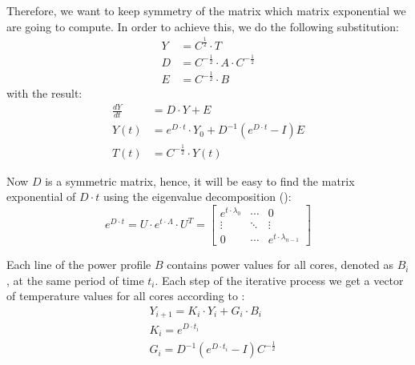Therefore, we want to keep symmetry of the matrix which matrix exponential we are going to compute. In order to achieve this, we do the following substitution:
\begin{align*}
  Y & = C^{\frac{1}{2}} \cdot T \\
  D & = C^{-\frac{1}{2}} \cdot A \cdot C^{-\frac{1}{2}} \\
  E & = C^{-\frac{1}{2}} \cdot B
\end{align*}
with the result:
\begin{align}
  \frac{dY}{dt} & = D \cdot Y + E \nonumber \\
  Y(t) & = e^{D \cdot t} \cdot Y_{0} + D^{-1}(e^{D \cdot t} - I)E \label{eq:modified-solution} \\
  T(t) & = C^{-\frac{1}{2}} \cdot Y(t) \nonumber
\end{align}

Now $D$ is a symmetric matrix, hence, it will be easy to find the matrix exponential of $D \cdot t$ using the eigenvalue decomposition ():
\[
  e^{D \cdot t} = U \cdot e^{t \cdot \Lambda} \cdot U^T = \left[
      \begin{array}{ccc}
        e^{t \cdot \lambda_0} & \cdots & 0 \\
        \vdots & \ddots & \vdots \\
        0 & \cdots & e^{t \cdot \lambda_{n - 1}}
      \end{array}
    \right]
\]

Each line of the power profile $B$ contains power values for all cores, denoted as $B_i$, at the same period of time $t_i$. Each step of the iterative process we get a vector of temperature values for all cores according to :
\begin{align}
  & Y_{i+1} = K_i \cdot Y_i + G_i \cdot B_i \label{eq:ce-recurrent} \\
  & K_i = e^{D \cdot t_i} \nonumber \\
  & G_i = D^{-1}(e^{D \cdot t_i} - I) C^{-\frac{1}{2}} \nonumber
\end{align}

